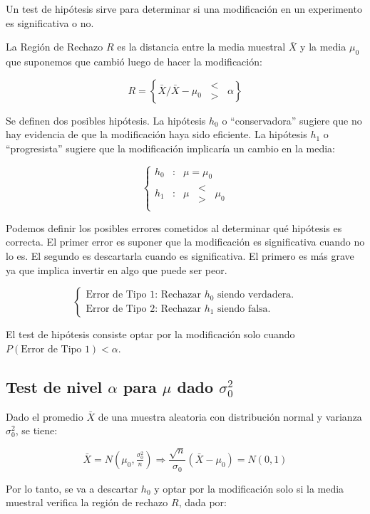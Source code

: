 \documentclass[a5paper,12pt,twoside]{book}
\begin{document}
Un test de hipótesis sirve para determinar si una modificación en un experimento es significativa o no.

La Región de Rechazo $R$ es la distancia entre la media muestral $\bar{X}$ y la media $\mu_0$ que suponemos que cambió luego de hacer la modificación:

$$ R=\left\{ \bar{X} \Big/ \bar{X} - \mu_0 \enspace \substack{< \\ >} \enspace \alpha \right\} $$

Se definen dos posibles hipótesis. La hipótesis $h_0$ o ``conservadora'' sugiere que no hay evidencia de que la modificación haya sido eficiente. La hipótesis $h_1$ o ``progresista'' sugiere que la modificación implicaría un cambio en la media:

$$ \left\{
\begin{array}{rcl}
h_0 &:& \mu = \mu_0 \\
h_1 &:& \mu \enspace \substack{< \\ >} \enspace \mu_0 \\
\end{array}
\right.$$

Podemos definir los posibles errores cometidos al determinar qué hipótesis es correcta. El primer error es suponer que la modificación es significativa cuando no lo es. El segundo es descartarla cuando es significativa. El primero es más grave ya que implica invertir en algo que puede ser peor.

$$ \left\{
\begin{array}{lll}
\textrm{Error de Tipo 1: Rechazar $h_0$ siendo verdadera.} \\
\textrm{Error de Tipo 2: Rechazar $h_1$ siendo falsa.}
\end{array}
\right.$$

El test de hipótesis consiste optar por la modificación solo cuando $P(\textrm{Error de Tipo 1})<\alpha$.

\subsection{Test de nivel $\alpha$ para $\mu$ dado $\sigma_0^2$}

Dado el promedio $\bar{X}$ de una muestra aleatoria con distribución normal y varianza $\sigma_0^2$, se tiene:

$$ \bar{X} = N(\mu_0,\tfrac{\sigma_0^2}{n}) \Rightarrow \dfrac{\sqrt{n}}{\sigma_0} (\bar{X}-\mu_0) = N(0,1) $$

Por lo tanto, se va a descartar $h_0$ y optar por la modificación solo si la media muestral verifica la región de rechazo $R$, dada por:
\end{document}
